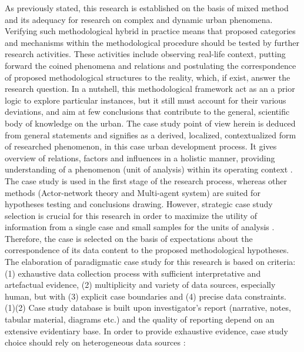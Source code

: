 \documentclass[11pt]{report}
\begin{document}
As previously stated, this research is established on the basis of mixed method and its adequacy for research on complex and dynamic urban phenomena. Verifying such methodological hybrid in practice means that proposed categories and mechanisms within the methodological procedure should be tested by further research activities. These activities include observing real-life context, putting forward the coined phenomena and relations and postulating the correspondence of proposed methodological structures to the reality, which, if exist, answer the research question. In a nutshell, this methodological framework act as an a prior logic to explore particular instances, but it still must account for their various deviations, and aim at few conclusions that contribute to the general, scientific body of knowledge on the urban. The case study point of view herein is deduced from general statements and signifies as a derived, localized, contextualized form of researched phenomenon, in this case urban development process. It gives overview of relations, factors and influences in a holistic manner, providing understanding of a phenomenon (unit of analysis) within its operating context .
\\
The case study is used in the first stage of the research process, whereas other methods (Actor-network theory and Multi-agent system) are suited for hypotheses testing and conclusions drawing. However, strategic case study selection is crucial for this research in order to maximize the utility of information from a single case and small samples for the units of analysis . Therefore, the case is selected on the basis of expectations about the correspondence of its data content to the proposed methodological hypotheses. The elaboration of paradigmatic case study for this research is based on  criteria: (1) exhaustive data collection process with sufficient interpretative and artefactual evidence, (2) multiplicity and variety of data sources, especially human, but with (3) explicit case boundaries and (4) precise data constraints.
\\
(1)(2) Case study database is built upon investigator's report (narrative, notes, tabular material, diagrams etc.) and the quality of reporting depend on an extensive evidentiary base. In order to provide exhaustive evidence, case study choice should rely on heterogeneous data sources :
\end{document}
